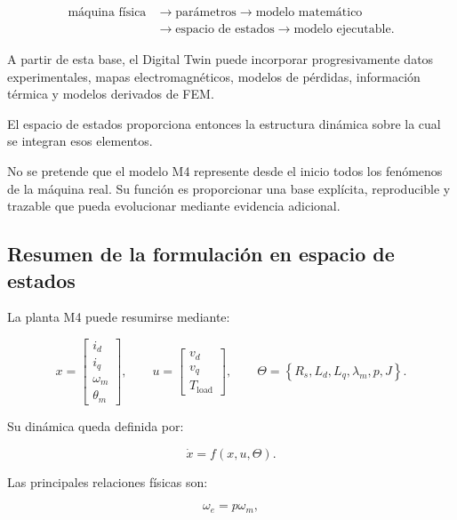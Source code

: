 \begin{equation}
\begin{aligned}
\text{máquina física}
&\rightarrow \text{parámetros}
\rightarrow \text{modelo matemático}
\\
&\rightarrow \text{espacio de estados}
\rightarrow \text{modelo ejecutable}.
\end{aligned}
\end{equation}

A partir de esta base, el Digital Twin puede incorporar progresivamente datos experimentales, mapas electromagnéticos, modelos de pérdidas, información térmica y modelos derivados de FEM.

El espacio de estados proporciona entonces la estructura dinámica sobre la cual se integran esos elementos.

No se pretende que el modelo M4 represente desde el inicio todos los fenómenos de la máquina real. Su función es proporcionar una base explícita, reproducible y trazable que pueda evolucionar mediante evidencia adicional.

\subsection{Resumen de la formulación en espacio de estados}

La planta M4 puede resumirse mediante:

\begin{equation}
x=
\begin{bmatrix}
i_d\\
i_q\\
\omega_m\\
\theta_m
\end{bmatrix},
\qquad
u=
\begin{bmatrix}
v_d\\
v_q\\
T_{\mathrm{load}}
\end{bmatrix},
\qquad
\Theta=
\left\{
R_s,L_d,L_q,\lambda_m,p,J
\right\}.
\end{equation}

Su dinámica queda definida por:

\begin{equation}
\dot{x}=f(x,u,\Theta).
\end{equation}

Las principales relaciones físicas son:

\begin{equation}
\omega_e=p\omega_m,
\end{equation}

